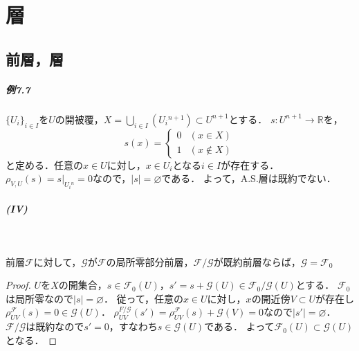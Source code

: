\chapter{層}
\section{前層，層}
\paragraph{例7.7}
$\{U_i\}_{i \in I}$を$U$の開被覆，$X = \bigcup_{i \in I} (U_i{}^{n+1}) \subset U^{n+1}$とする．
$s \colon U^{n+1} \to \mathbb{R}$を，
\[s(x) =
\begin{cases}
  0 & (x \in X) \\
  1 & (x \not\in X)
\end{cases}
\]
と定める．任意の$x \in U$に対し，$x \in U_i$となる$i \in I$が存在する．
$\rho_{V, U}(s) = s|_{U_i{}^n} = 0$なので，$\lvert s \rvert = \varnothing$である．
よって，A.S.層は既約でない．

\paragraph{(IV)}~
\begin{screen}
  前層$\mathscr{F}$に対して，$\mathscr{G}$が$\mathscr{F}$の局所零部分前層，$\mathscr{F}/\mathscr{G}$が既約前層ならば，$\mathscr{G} = \mathscr{F}_0$
\end{screen}
\begin{proof}
  $U$を$X$の開集合，$s \in \mathscr{F}_0(U)$，$s' = s + \mathscr{G}(U) \in \mathscr{F}_0 / \mathscr{G} (U)$とする．
  $\mathscr{F}_0$は局所零なので$\lvert s \rvert = \varnothing$．
  従って，任意の$x \in U$に対し，$x$の開近傍$V \subset U$が存在し$\rho^\mathscr{F}_{UV}(s) = 0 \in \mathscr{G}(U)$．
  $\rho^{F/\mathscr{G}}_{UV}(s') = \rho^\mathscr{F}_{UV}(s) + \mathscr{G}(V) = 0$なので$\lvert s' \rvert = \varnothing$．
  $\mathscr{F}/\mathscr{G}$は既約なので$s' = 0$，すなわち$s \in \mathscr{G}(U)$である．
  よって$\mathscr{F}_0(U) \subset \mathscr{G}(U)$となる．
\end{proof}

